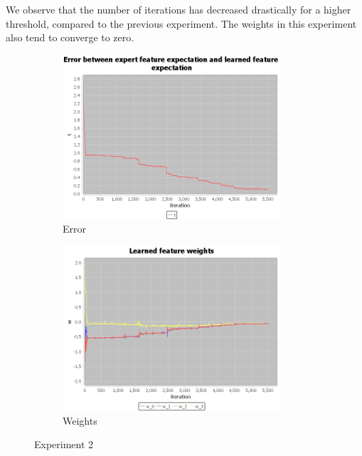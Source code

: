 \documentclass[10pt,a4paper,twocolumn]{article}
\begin{document}
We observe that the number of iterations has decreased drastically for a higher threshold, compared to the previous experiment. The weights in this experiment also tend to converge to zero. 

\begin{figure}[h]
\begin{subfigure}[b]{0.5\textwidth}
	\includegraphics[width=\textwidth]{experiment_2_t}
	\caption{Error}
	\label{fig:experiment2t}
\end{subfigure}
\begin{subfigure}[b]{0.5\textwidth}
	\includegraphics[width=\textwidth]{experiment_2_w}
	\caption{Weights}
	\label{fig:experiment2w}
\end{subfigure}
\caption{Experiment 2}
\end{figure}
\end{document}
